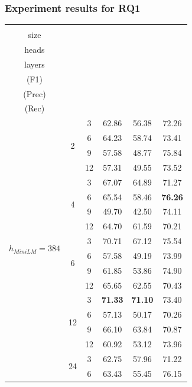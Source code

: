 \documentclass{ieeeaccess}
\begin{document}
\subsubsection{Experiment results for RQ1}
\begin{table}[h]
\centering
\begin{tabular}{cccccc}
\toprule
\Xhline{2\arrayrulewidth}
\textbf{\makecell{Hidden\\ size}} & \textbf{\makecell{Num \\ heads} }& \textbf{\makecell{Num \\ layers}} & \textbf{\makecell{F1 score\\ (F1)}} & \textbf{\makecell{Precision\\ (Prec)}} & \textbf{\makecell{Recall\\ (Rec)}}\\
\midrule
\hline
\multirow{20}{*}{$h_{MiniLM}=384$}     & \multirow{4}{*}{2}  
         & 3  &62.86 & 56.38 &72.26\\
    &    &\rowcolor{gray!15}  6  &64.23 & 58.74 &73.41 \\
    &    & 9  &57.58 & 48.77 &75.84  \\
    &    &\rowcolor{gray!15}  12 &57.31 & 49.55 &73.52 \\
\cline{2-6}
    & \multirow{4}{*}{4}  & 3  &67.07 & 64.89 &71.27  \\
    &    &\rowcolor{gray!15}  6  &65.54 & 58.46 & \textbf{76.26}  \\
    &    & 9  &49.70 & 42.50 &74.11 \\
    &    &\rowcolor{gray!15}  12 &64.70 & 61.59 &70.21  \\
\cline{2-6}
    & \multirow{4}{*}{6}  & 3  &70.71 & 67.12 &75.54 \\
    &    &\rowcolor{gray!15}  6  &57.58 & 49.19 &73.99 \\
    &    & 9  &61.85 & 53.86 &74.90 \\
    &    &\rowcolor{gray!15}  12 &65.65 & 62.55 &70.43\\
\cline{2-6}
    & \multirow{4}{*}{12} & 3  &\textbf{71.33} & \textbf{71.10} &73.40  \\
    &    &\rowcolor{gray!15}  6  &57.13 & 50.17 &70.26  \\
    &    & 9  &66.10 & 63.84 &70.87\\
    &    &\rowcolor{gray!15}  12 &60.92 & 53.12 &73.96\\
\cline{2-6}
    & \multirow{4}{*}{24} & 3  &62.75 & 57.96 &71.22 \\
    &    &\rowcolor{gray!15}  6  &63.43 & 55.45 &76.15\\

\end{tabular}
\end{table}
\end{document}
